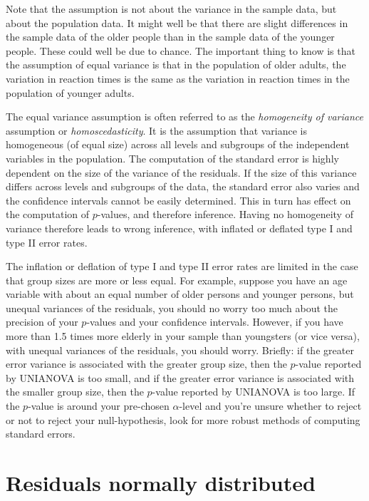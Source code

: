 \documentclass[]{book}\usepackage[]{graphicx}\usepackage[]{color}
\begin{document}
Note that the assumption is not about the variance in the sample data, but about the population data. It might well be that there are slight differences in the sample data of the older people than in the sample data of the younger people. These could well be due to chance. The important thing to know is that the assumption of equal variance is that in the population of older adults, the variation in reaction times is the same as the variation in reaction times in the population of younger adults. 

The equal variance assumption is often referred to as the \textit{homogeneity of variance} assumption or  \textit{homoscedasticity}. It is the assumption that variance is homogeneous (of equal size) across all levels and subgroups of the independent variables in the population. The computation of the standard error is highly dependent on the size of the variance of the residuals. If the size of this variance differs across levels and subgroups of the data, the standard error also varies and the confidence intervals cannot be easily determined. This in turn has effect on the computation of $p$-values, and therefore inference. Having no homogeneity of variance therefore leads to wrong inference, with inflated or deflated type I and type II error rates. 

The inflation or deflation of type I and type II error rates are limited in the case that group sizes are more or less equal. For example, suppose you have an age variable with about an equal number of older persons and younger persons, but unequal variances of the residuals, you should no worry too much about the precision of your $p$-values and your confidence intervals. However, if you have more than 1.5 times more elderly in your sample than youngsters (or vice versa), with unequal variances of the residuals, you should worry. Briefly: if the greater error variance is associated with the greater group size, then the $p$-value reported by UNIANOVA is too small, and if the greater error variance is associated with the smaller group size, then the $p$-value reported by UNIANOVA is too large. If the $p$-value is around your pre-chosen $\alpha$-level and you're unsure whether to reject or not to reject your null-hypothesis, look for more robust methods of computing standard errors.  


\section{Residuals normally distributed}
\end{document}
